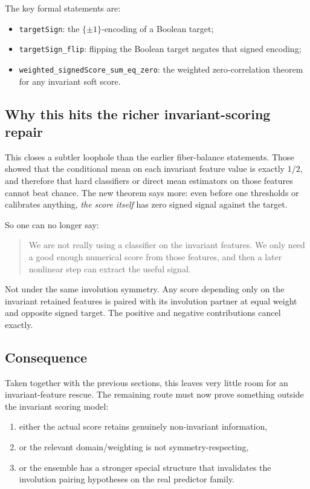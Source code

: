 \documentclass[11pt]{article}
\theoremstyle{remark}
\begin{document}
\noindent
The key formal statements are:
\begin{itemize}[leftmargin=1.5em]
  \item \texttt{targetSign}: the \(\{\pm 1\}\)-encoding of a Boolean target;
  \item \texttt{targetSign\_flip}: flipping the Boolean target negates that signed encoding;
  \item \texttt{weighted\_signedScore\_sum\_eq\_zero}: the weighted zero-correlation theorem for
  any invariant soft score.
\end{itemize}

\subsection{Why this hits the richer invariant-scoring repair}

This closes a subtler loophole than the earlier fiber-balance statements.  Those showed that the
conditional mean on each invariant feature value is exactly \(1/2\), and therefore that hard
classifiers or direct mean estimators on those features cannot beat chance.  The new theorem says
more: even before one thresholds or calibrates anything, \emph{the score itself} has zero signed
signal against the target.

So one can no longer say:
\begin{quote}
We are not really using a classifier on the invariant features.  We only need a good enough
numerical score from those features, and then a later nonlinear step can extract the useful
signal.
\end{quote}

Not under the same involution symmetry.  Any score depending only on the invariant retained
features is paired with its involution partner at equal weight and opposite signed target.  The
positive and negative contributions cancel exactly.

\subsection{Consequence}

Taken together with the previous sections, this leaves very little room for an invariant-feature
rescue.  The remaining route must now prove something outside the invariant scoring model:
\begin{enumerate}[leftmargin=1.5em]
  \item either the actual score retains genuinely non-invariant information,
  \item or the relevant domain/weighting is not symmetry-respecting,
  \item or the ensemble has a stronger special structure that invalidates the involution pairing
  hypotheses on the real predictor family.
\end{enumerate}
\end{document}
